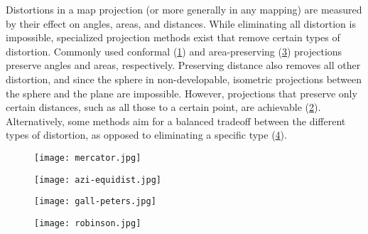 Distortions in a map projection (or more generally in any mapping) are measured by their effect on angles, areas, and distances.
While eliminating all distortion is impossible, specialized projection methods exist that remove certain types of distortion.
Commonly used conformal (\cref{fig:mercator}) and area-preserving (\cref{fig:gall-peters}) projections preserve angles and areas, respectively.
Preserving distance also removes all other distortion, and since the sphere in non-developable, isometric projections between the sphere and the plane are impossible.
However, projections that preserve only certain distances, such as all those to a certain point, are achievable (\cref{fig:azi-equidist}).
Alternatively, some methods aim for a balanced tradeoff between the different types of distortion, as opposed to eliminating a specific type (\cref{fig:robinson}).


\begin{figure*}[htp!]
	\centering
	\begin{subfigure}[]{0.5\textwidth}
		\centering
		\texttt{[image: mercator.jpg]}
		\caption{}
		\label{fig:mercator}
	\end{subfigure}%
	\begin{subfigure}[]{0.5\textwidth}
		\centering
		\texttt{[image: azi-equidist.jpg]}
		\caption{}
		\label{fig:azi-equidist}
	\end{subfigure}%
	
	\begin{subfigure}[]{0.5\textwidth}
		\centering
		\texttt{[image: gall-peters.jpg]}
		\caption{}
		\label{fig:gall-peters}
	\end{subfigure}%
	\begin{subfigure}[]{0.5\textwidth}
		\centering
		\texttt{[image: robinson.jpg]}
		\caption{}
		\label{fig:robinson}
	\end{subfigure}
	
	\caption[Four popular map projections]{
		Four common map projections and special properties they possess: (a) Mercator~\cite{mercator}, conformal; (b) azimuthal equidistant~\cite{azi-equidist}, equidistant to centre point; (c) Gall-Peters~\cite{gall-peters}, equal area; and (d) Robinson~\cite{robinson}, compromise (no measures preserved).
		Images courtesy of Daniel R. Strebe -- CC BY-SA 3.0
	}
	\label{fig:projections}
\end{figure*}


